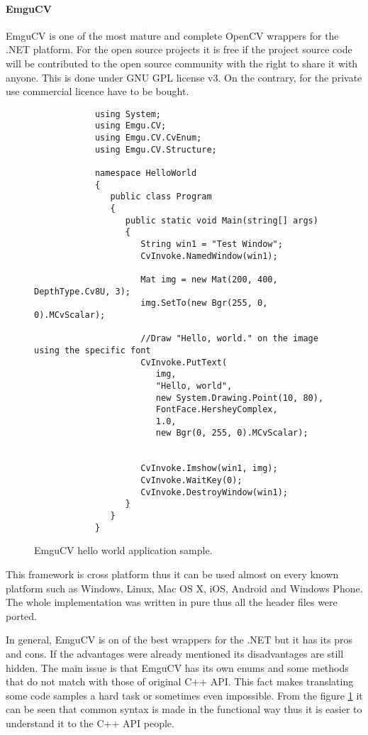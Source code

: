 \documentclass[../../../../main]{subfiles}
\begin{document}
\paragraph{EmguCV}

\ac{EmguCV} is one of the most mature and complete \ac{OpenCV} wrappers for the .NET platform. For the open source projects it is free if the project source code will be contributed to the open source community with the right to share it with anyone. This is done under GNU GPL license v3. On the contrary, for the private use commercial licence have to be bought.

\begin{figure} [!ht]
  \centering    
    \lstset{style=sharpc}
        \begin{lstlisting}
            using System;
            using Emgu.CV;
            using Emgu.CV.CvEnum;
            using Emgu.CV.Structure;
            
            namespace HelloWorld
            {
               public class Program
               {
                  public static void Main(string[] args)
                  {
                     String win1 = "Test Window";
                     CvInvoke.NamedWindow(win1);
            
                     Mat img = new Mat(200, 400, DepthType.Cv8U, 3); 
                     img.SetTo(new Bgr(255, 0, 0).MCvScalar);
            
                     //Draw "Hello, world." on the image using the specific font
                     CvInvoke.PutText(
                        img, 
                        "Hello, world", 
                        new System.Drawing.Point(10, 80), 
                        FontFace.HersheyComplex, 
                        1.0, 
                        new Bgr(0, 255, 0).MCvScalar);
                     
            
                     CvInvoke.Imshow(win1, img); 
                     CvInvoke.WaitKey(0); 
                     CvInvoke.DestroyWindow(win1);
                  }
               }
            }
        \end{lstlisting}
  \caption{EmguCV hello world application sample.}
  \label{emgucvhelloworld}
\end{figure}

This framework is cross platform thus it can be used almost on every known platform such as Windows, Linux, Mac OS X, iOS, Android and Windows Phone. The whole implementation was written in pure {\Csharp} thus all the header files were ported.

In general, \ac{EmguCV} is on of the best wrappers for the .NET but it has its pros and cons. If the advantages were already mentioned its disadvantages are still hidden. The main issue is that \ac{EmguCV} has its own enums and some methods that do not match with those of original C++ \ac{API}. This fact makes translating some code samples a hard task or sometimes even impossible. From the figure \ref{emgucvhelloworld} it can be seen that common syntax is made in the functional way thus it is easier to understand it to the C++ \ac{API} people.
\end{document}
